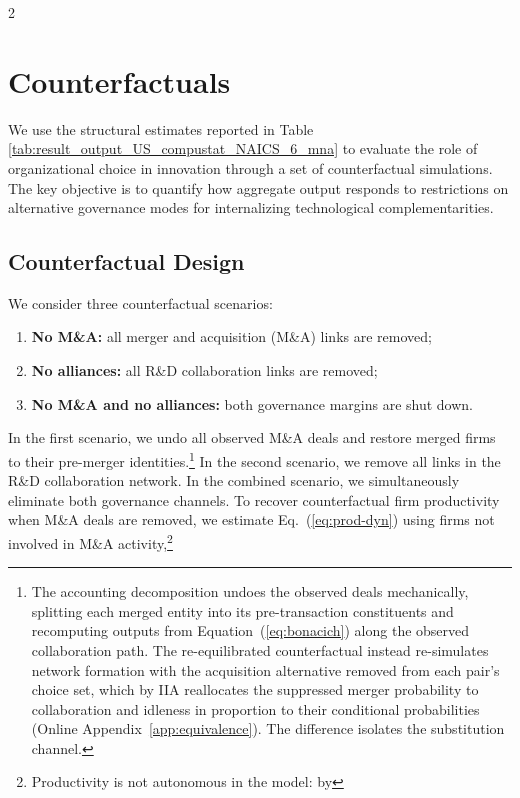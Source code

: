 \documentclass[12pt]{article}
\begin{document}
\begin{spacing}{2}
\FloatBarrier

\section{Counterfactuals}
\label{sec:counterfactual}
We use the structural estimates reported in Table \ref{tab:result_output_US_compustat_NAICS_6_mna} to evaluate the role of organizational choice in innovation through a set of counterfactual simulations. The key objective is to quantify how aggregate output responds to restrictions on alternative governance modes for internalizing technological complementarities.

\subsection{Counterfactual Design}
We consider three counterfactual scenarios:
\begin{enumerate}
    \item \textbf{No M\&A:} all merger and acquisition (M\&A) links are removed;
    \item \textbf{No alliances:} all R\&D collaboration links are removed;
    \item \textbf{No M\&A and no alliances:} both governance margins are shut down.
\end{enumerate}
In the first scenario, we undo all observed M\&A deals and restore merged firms to their pre-merger identities.\footnote{The accounting decomposition undoes the observed deals mechanically,
splitting each merged entity into its pre-transaction constituents and
recomputing outputs from Equation~(\ref{eq:bonacich}) along the observed
collaboration path. The re-equilibrated counterfactual instead re-simulates
network formation with the acquisition alternative removed from each pair's
choice set, which by IIA reallocates the suppressed merger probability to
collaboration and idleness in proportion to their conditional probabilities
(Online Appendix~\ref{app:equivalence}). The difference isolates the
substitution channel.} In the second scenario, we remove all links in the R\&D collaboration network. In the combined scenario, we simultaneously eliminate both governance channels. To recover counterfactual firm productivity when M\&A deals are removed, we estimate Eq.~(\ref{eq:prod-dyn}) using firms not involved in M\&A activity,\footnote{Productivity is not autonomous in the model: by
}
\end{spacing}
\end{document}
